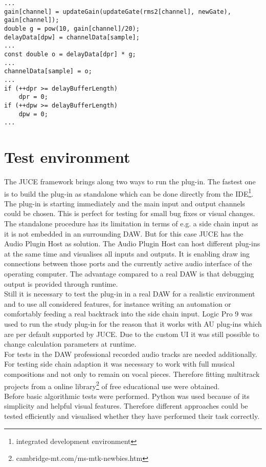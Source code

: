\begin{lstlisting}[frame=single]
...
gain[channel] = updateGain(updateGate(rms2[channel], newGate),
gain[channel]);
double g = pow(10, gain[channel]/20);
delayData[dpw] = channelData[sample];
...
const double o = delayData[dpr] * g;
...
channelData[sample] = o;
...
if (++dpr >= delayBufferLength)
	dpr = 0;
if (++dpw >= delayBufferLength)
	dpw = 0;
...
\end{lstlisting}

\section{Test environment}

The JUCE framework brings along two ways to run the plug-in. The fastest one is to build the plug-in as standalone which can be done directly from the IDE\footnote{integrated development environment}. The plug-in is starting immediately and the main input and output channels could be chosen. This is perfect for testing for small bug fixes or visual changes. The standalone procedure has its limitation in terms of e.g. a side chain input as it is not embedded in an surrounding DAW. But for this case JUCE has the Audio Plugin Host as solution. The Audio Plugin Host can host different plug-ins at the same time and visualises all inputs and outputs. It is enabling draw ing connections between those ports and the currently active audio interface of the operating computer. The advantage compared to a real DAW is that debugging output is provided through runtime.\\
Still it is necessary to test the plug-in in a real DAW for a realistic environment and to use all considered features, for instance writing an automation or comfortably feeding a real backtrack into the side chain input. Logic Pro 9 was used to run the study plug-in for the reason that it works with AU plug-ins which are per default supported by JUCE. Due to the custom UI it was still possible to change calculation parameters at runtime.\\
For tests in the DAW professional recorded audio tracks are needed additionally. For testing side chain adaption it was necessary to work with full musical compositions and not only to remain on vocal pieces. Therefore fitting multitrack projects from a online library\footnote{cambridge-mt.com/ms-mtk-newbies.htm} of free educational use were obtained.\\
Before basic algorithmic tests were performed. Python was used because of its simplicity and helpful visual features. Therefore different approaches could be tested efficiently and visualised whether they have performed their task correctly.\\
